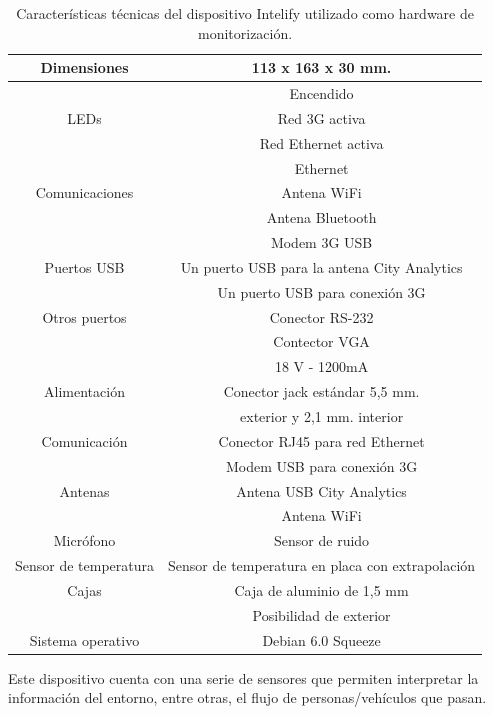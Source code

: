 \documentclass[twocolumn,twoside]{Jornadas}
\begin{document}
\begin{table}[htpb]
\caption{Características técnicas del dispositivo Intelify utilizado como hardware de monitorización.}
\label{caracteristicas}
\begin{center}
 {\footnotesize
\begin{tabular}{|c|c|}
\hline
Dimensiones & 113 x 163 x 30 mm. \\
\hline
     & Encendido  \\
LEDs & Red 3G activa  \\
     & Red Ethernet activa  \\
\hline
				& Ethernet  \\
Comunicaciones	& Antena WiFi  \\
				& Antena Bluetooth  \\  
				& Modem 3G USB  \\
\hline
Puertos USB & Un puerto USB para la antena City Analytics   \\
			& Un puerto USB para conexión 3G  \\
\hline
Otros puertos & Conector RS-232   \\
			  & Contector VGA  \\
\hline
 			 & 18 V - 1200mA    \\
Alimentación & Conector jack estándar 5,5 mm. \\
			 & exterior y 2,1 mm. interior  \\
\hline
Comunicación & Conector RJ45 para red Ethernet   \\
			 & Modem USB para conexión 3G  \\
\hline
Antenas & Antena USB City Analytics   \\
		& Antena WiFi  \\
\hline
Micrófono & Sensor de ruido  \\
\hline
Sensor de temperatura & Sensor de temperatura en placa con extrapolación  \\
\hline
Cajas   & Caja de aluminio de 1,5 mm   \\
		& Posibilidad de exterior  \\
\hline
Sistema operativo & Debian 6.0 	Squeeze  \\
\hline
\end{tabular}
 }
\end{center}
\end{table}


Este dispositivo cuenta con una serie de sensores que permiten interpretar la información del entorno, entre otras, el flujo de personas/vehículos que pasan.
\end{document}

